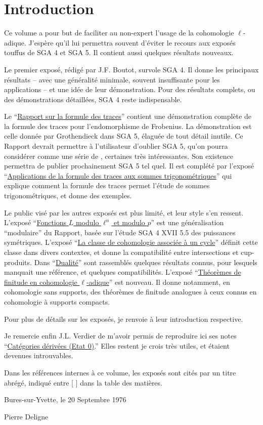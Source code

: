 
\chapter*{Introduction}

Ce volume a pour but de faciliter au non-expert l'usage de la 
cohomologie $\ell$-adique. J'espère qu'il lui permettra souvent d'éviter le 
recours aux exposés touffus de SGA 4 et SGA 5. Il contient aussi quelques 
résultats nouveaux. 

Le premier exposé, rédigé par J.F. Boutot, survole SGA 4. Il donne les 
principaux résultats -- avec une généralité minimale, souvent 
insuffisante pour les applications -- et une idée de leur démonstration. Pour 
des résultats complets, ou des démonstrations détaillées, SGA 4 reste 
indispensable. 

Le ``\hyperref[II]{Rapport sur la formule des traces}'' contient une démonstration complète de 
la formule des traces pour l'endomorphisme de Frobenius. La démonstration est 
celle donnée par Grothendieck dans SGA 5, élaguée de tout détail inutile. Ce 
Rapport devrait permettre à l'utilisateur d'oublier SGA 5, qu'on pourra 
considérer comme une série de , certaines très intéressantes. Son 
existence permettra de publier prochainement SGA 5 tel quel. Il est complété 
par l'exposé ``\hyperref[VI]{Applications de la formule des traces aux sommes trigonométriques}'' qui explique comment la formule des traces permet 
l'étude de sommes trigonométriques, et donne des exemples. 

Le public visé par les autres exposés est plus limité, et leur style s'en 
ressent. L'exposé ``\hyperref[III]{Fonctions $L$ modulo $\ell^n$ et modulo $p$}'' est une 
généralisation ``modulaire'' du Rapport, basée sur l'étude SGA 4 XVII 5.5 des 
puissances symétriques. L'exposé ``\hyperref[IV]{La classe de cohomologie associée à un cycle}'' 
définit cette classe dans divers contextes, et donne la compatibilité 
entre intersections et cup-produits. Dans ``\hyperref[V]{Dualité}'' sont rassemblés 
quelques résultats connus, pour lesquels manquait une référence, et quelques 
compatibilités. L'exposé ``\hyperref[VII]{Théorèmes de finitude en cohomologie $\ell$-adique}'' 
est nouveau. Il donne notamment, en cohomologie sans supports, des théorèmes de 
finitude analogues à ceux connus en cohomologie à supports compacts. 

Pour plus de détails sur les exposés, je renvoie à leur introduction 
respective. 

Je remercie enfin J.L. Verdier de m'avoir permis de reproduire ici ses notes 
``\hyperref[VIII]{Catégories dérivées (Etat 0)}.'' Elles restent je crois très utiles, et 
étaient devenues introuvables. 

Dans les références internes à ce volume, les exposés sont cités par 
un titre abrégé, indiqué entre [ ] dans la table des matières. 

\vspace{20pt}
Bures-sur-Yvette, le 20 Septembre 1976

\vspace{5pt}
Pierre Deligne
